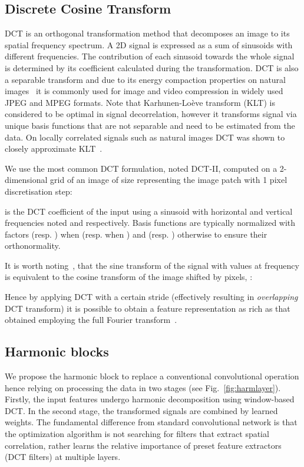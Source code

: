 \documentclass[12pt,a4paper]{article}
\begin{document}
\subsection{Discrete Cosine Transform} \label{sec:dct}

DCT is an orthogonal transformation method that decomposes an image to its spatial frequency spectrum. A 2D signal is expressed as a sum of sinusoids with different frequencies. The contribution of each sinusoid towards the whole signal is determined by its coefficient calculated during the transformation.
DCT is also a separable transform and due to its energy compaction properties on natural images~\cite{Wang12} it is commonly used for image and video compression in widely used JPEG and MPEG formats. Note that Karhunen-Lo{\`e}ve transform (KLT) is considered to be optimal in signal decorrelation, however it transforms signal via unique basis functions that are not separable and need to be estimated from the data. On locally correlated signals such as natural images DCT was shown to closely approximate KLT~\cite{Wang12}.

We use the most common DCT formulation, noted DCT-II,  computed on a 2-dimensional grid of an image  of size  representing the image patch with 1 pixel discretisation step:

 is  the DCT coefficient  of the input  using a sinusoid with horizontal and vertical frequencies noted   and  respectively. Basis functions are typically normalized with factors  (resp. ) when  (resp. when )   and  (resp. ) otherwise to ensure their orthonormality. 

It is worth noting~\cite{Ulicny19}, that the sine transform of the signal  with  values at frequency  is equivalent to the cosine transform of the image shifted by  pixels, :

Hence by applying DCT with a certain stride (effectively resulting in {\it overlapping} DCT transform) it is possible to obtain a feature representation as rich as that obtained employing the full Fourier transform~\cite{Ulicny19}.


\subsection{Harmonic blocks}

We propose the harmonic block  to replace a conventional convolutional operation hence relying on processing the data in two stages (see Fig.~\ref{fig:harmlayer}). Firstly, the input features undergo harmonic decomposition using window-based DCT.
In the second stage, the transformed signals are combined by learned weights. 
The fundamental difference from standard convolutional network is that the optimization algorithm is not searching for filters that extract spatial correlation, rather learns the relative importance of preset feature extractors (DCT filters) at multiple layers.
\end{document}
